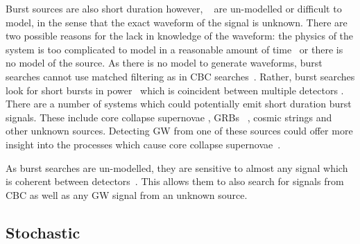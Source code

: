 Burst sources are also short duration however, ~ are un-modelled or
difficult to model, in the sense that the exact waveform of the signal is
unknown.  There are two possible reasons for the lack in knowledge of the
waveform: the physics of the system is too complicated to model in a reasonable
amount of time~ or there is no model of the source.  As there is
no model to generate waveforms, burst searches cannot use matched filtering as
in \gls{CBC} searches~. Rather, burst searches look
for short bursts in power~
which is coincident between multiple detectors
\citep{cornish2015BayeswaveBayesian, klimenko2008CoherentMethod}.  There are a
number of systems which could potentially emit  short duration burst signals.
These include core collapse supernovae \citep{ott2008GravitationalWave},
\glspl{GRB} \citep{aasi2014SearchGravitational}~, cosmic strings
\citep{damour2005GravitationalRadiation} and other unknown sources.  Detecting
\gls{GW} from one of these sources could offer more insight into the processes
which cause core collapse supernovae~. 

As burst searches are un-modelled, they are sensitive to almost any signal
which is coherent between detectors~. This allows them to also search for signals from \gls{CBC} as
well as any \gls{GW} signal from an unknown source.~


\subsection{Stochastic}


